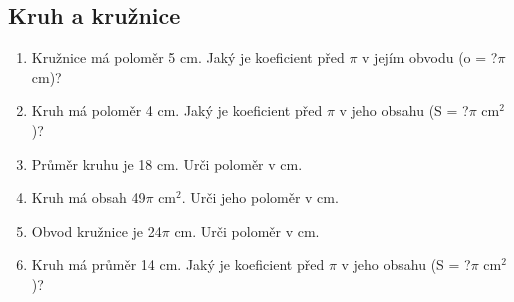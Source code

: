 \documentclass[11pt,a4paper]{article}
\begin{document}
\subsection*{Kruh a kružnice}
\begin{enumerate}[label=\arabic*.,start=19,leftmargin=*,itemsep=6pt]
\item Kružnice má poloměr 5 cm. Jaký je koeficient před $\pi$ v jejím obvodu (o = ?$\pi$ cm)?\par\vspace{2mm}
\item Kruh má poloměr 4 cm. Jaký je koeficient před $\pi$ v jeho obsahu (S = ?$\pi$ cm$^2$)?\par\vspace{2mm}
\item Průměr kruhu je 18 cm. Urči poloměr v cm.\par\vspace{2mm}
\item Kruh má obsah 49$\pi$ cm$^2$. Urči jeho poloměr v cm.\par\vspace{2mm}
\item Obvod kružnice je 24$\pi$ cm. Urči poloměr v cm.\par\vspace{2mm}
\item Kruh má průměr 14 cm. Jaký je koeficient před $\pi$ v jeho obsahu (S = ?$\pi$ cm$^2$)?\par\vspace{2mm}
\end{enumerate}
\end{document}
